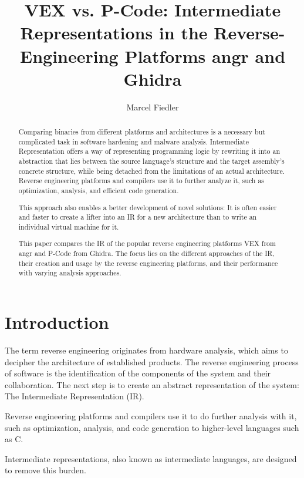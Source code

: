 \documentclass[seminar]{plai}
\title{VEX vs. P-Code: Intermediate Representations in the Reverse-Engineering Platforms angr and Ghidra}
\author{Marcel Fiedler}
\begin{document}
\maketitle

\begin{abstract}

\noindent Comparing binaries from different platforms and architectures is a necessary but complicated task in software hardening and malware analysis.
Intermediate Representation offers a way of representing programming logic by rewriting it into an abstraction that lies between the source language's structure and the target assembly's concrete structure, while being detached from the limitations of an actual architecture.
Reverse engineering platforms and compilers use it to further analyze it, such as optimization, analysis, and efficient code generation.

This approach also enables a better development of novel solutions: It is often easier and faster to create a lifter into an IR for a new architecture than to write an individual virtual machine for it.

This paper compares the IR of the popular reverse engineering platforms VEX from angr and P-Code from Ghidra.
The focus lies on the different approaches of the IR, their creation and usage by the reverse engineering platforms, and their performance with varying analysis approaches.
\end{abstract}

\section{Introduction}
\label{sec:introduction}

The term reverse engineering originates from hardware analysis, which aims to decipher the architecture of established products.\cite{reverse-engineering-design-recovery-taxonomy}
The reverse engineering process of software is the identification of the components of the system and their collaboration. The next step is to create an abstract representation of the system: The Intermediate Representation (IR).

Reverse engineering platforms and compilers use it to do further analysis with it, such as optimization, analysis, and code generation to higher-level languages such as C.

Intermediate representations, also known as intermediate languages, are designed to remove this burden.
\end{document}

